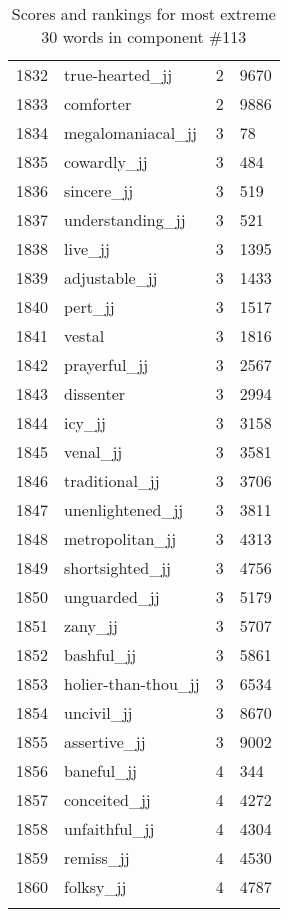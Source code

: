 \begin{longtable}[!htbp]{| rlr@{.}l |}
    1832 & true-hearted\_jj & 2 & 9670 \\
    1833 & comforter & 2 & 9886 \\
    1834 & megalomaniacal\_jj & 3 & 78 \\
    1835 & cowardly\_jj & 3 & 484 \\
    1836 & sincere\_jj & 3 & 519 \\
    1837 & understanding\_jj & 3 & 521 \\
    1838 & live\_jj & 3 & 1395 \\
    1839 & adjustable\_jj & 3 & 1433 \\
    1840 & pert\_jj & 3 & 1517 \\
    1841 & vestal & 3 & 1816 \\
    1842 & prayerful\_jj & 3 & 2567 \\
    1843 & dissenter & 3 & 2994 \\
    1844 & icy\_jj & 3 & 3158 \\
    1845 & venal\_jj & 3 & 3581 \\
    1846 & traditional\_jj & 3 & 3706 \\
    1847 & unenlightened\_jj & 3 & 3811 \\
    1848 & metropolitan\_jj & 3 & 4313 \\
    1849 & shortsighted\_jj & 3 & 4756 \\
    1850 & unguarded\_jj & 3 & 5179 \\
    1851 & zany\_jj & 3 & 5707 \\
    1852 & bashful\_jj & 3 & 5861 \\
    1853 & holier-than-thou\_jj & 3 & 6534 \\
    1854 & uncivil\_jj & 3 & 8670 \\
    1855 & assertive\_jj & 3 & 9002 \\
    1856 & baneful\_jj & 4 & 344 \\
    1857 & conceited\_jj & 4 & 4272 \\
    1858 & unfaithful\_jj & 4 & 4304 \\
    1859 & remiss\_jj & 4 & 4530 \\
    1860 & folksy\_jj & 4 & 4787 \\
    \hline
    \caption{Scores and rankings for most extreme 30 words in component \#113} \\
\end{longtable}
